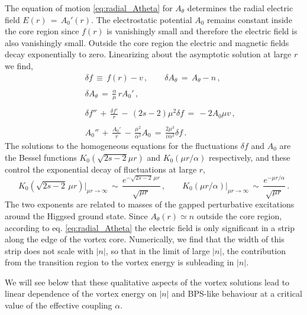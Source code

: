 \documentclass[12pt,a4paper]{article}
\def\be{\begin{equation}}
\def\ee{\end{equation}}
\newcommand{\bea}{\begin{eqnarray}}
\newcommand{\eea}{\end{eqnarray}}
\begin{document}
The equation of motion \eqref{eq:radial_Atheta} for $A_\theta$ determines the  radial electric field $E(r)\,=\,A_0'(r)$. 
The electrostatic potential $A_0$ remains constant inside the core region since $f(r)$ is vanishingly small and therefore the electric field is also vanishingly small. 
Outside the core region the electric and magnetic fields decay exponentially to zero. Linearizing about the asymptotic solution at  large $r$ we find,
\bea
&&\delta f\,\equiv\, f(r)-v\,,\qquad \delta A_\theta\,=\, A_\theta-n\,,\\\nonumber\\\nonumber
&&\delta A_\theta\,=\,\frac{\alpha}{\mu}\, r A_0'\,,\\\nonumber\\\nonumber
&&\delta f'' \,+\,\frac{\delta f'}{r}\,-\,(2s-2)\mu^2\delta f\,=\, -2 A_0 \mu v\,,\\\nonumber\\\nonumber
&&A_0''\,+\,\frac{A_0'}{r}\,-\,\frac{\mu^2}{\alpha^2}A_0\,=\,\frac{2\mu^3}{v\alpha^2}\delta f\,.
\eea
The solutions to the homogeneous equations for the fluctuations $\delta f$ and $A_0$ are the Bessel functions $K_0\left(\sqrt{2s-2}\mu r\right)$ and $K_0\left(\mu r/\alpha\right)$ respectively, and these control the exponential decay of fluctuations at large $r$,
\be
K_0\left(\sqrt{2s-2}\,\mu r\right)\big|_{\mu r\to\infty} \,\sim\,\frac{e^{-\sqrt{2s-2}\,\mu r}}{\sqrt {\mu r}}\,,\qquad K_0\left(\mu r/\alpha\right)\big|_{\mu r\to\infty} \,\sim\,\frac{e^{-\mu r/\alpha}}{\sqrt {\mu r}} \,.         
\ee
The two exponents are related to  masses of the gapped perturbative excitations around the Higgsed ground state.
Since $A_\theta(r)\simeq n$ outside the core region, according to  eq. \eqref{eq:radial_Atheta} the electric field is only significant in a strip  along the edge of the vortex core.  Numerically, we find that the width of this strip does not scale with $|n|$, so that in the limit of large $|n|$, the contribution from the transition region to the vortex energy is subleading in $|n|$. 

We will see below that these qualitative aspects of the vortex solutions lead to linear dependence of the vortex energy on $|n|$ and BPS-like behaviour at a critical value of the effective coupling $\alpha$.
\end{document}
